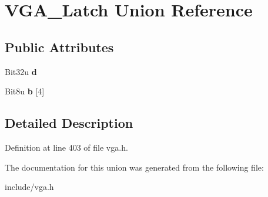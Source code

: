 \hypertarget{unionVGA__Latch}{\section{V\-G\-A\-\_\-\-Latch Union Reference}
\label{unionVGA__Latch}
}
\subsection*{Public Attributes}
\begin{DoxyCompactItemize}
\item 
\hypertarget{unionVGA__Latch_a68ae346aa35c3835ad2b7c988e9b53e6}{Bit32u {\bfseries d}}\label{unionVGA__Latch_a68ae346aa35c3835ad2b7c988e9b53e6}

\item 
\hypertarget{unionVGA__Latch_a2c3c0ab6db68a5db80e2f71639b089e1}{Bit8u {\bfseries b} \mbox{[}4\mbox{]}}\label{unionVGA__Latch_a2c3c0ab6db68a5db80e2f71639b089e1}

\end{DoxyCompactItemize}


\subsection{Detailed Description}


Definition at line 403 of file vga.\-h.



The documentation for this union was generated from the following file\-:\begin{DoxyCompactItemize}
\item 
include/vga.\-h\end{DoxyCompactItemize}
